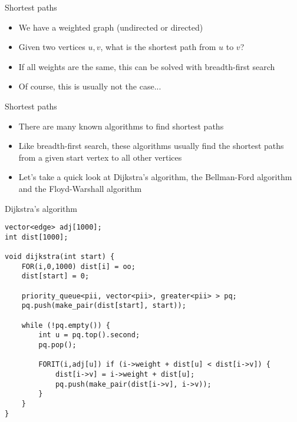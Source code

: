 \documentclass[12pt,t]{beamer}
\newcommand{\bi}{\begin{itemize}}
\newcommand{\ei}{\end{itemize}}
\begin{document}

\begin{frame}{Shortest paths}
    \vspace{40pt}
    \bi
        \item We have a weighted graph (undirected or directed)
        \item Given two vertices $u,v$, what is the shortest path from $u$ to $v$?
        \vspace{10pt}
        \item If all weights are the same, this can be solved with breadth-first search
        \item Of course, this is usually not the case...
    \ei
\end{frame}

\begin{frame}{Shortest paths}
    \vspace{40pt}
    \bi
        \item There are many known algorithms to find shortest paths
        \item Like breadth-first search, these algorithms usually find the shortest paths from a given start vertex to all other vertices
        \vspace{5pt}
        \item Let's take a quick look at Dijkstra's algorithm, the Bellman-Ford algorithm and the Floyd-Warshall algorithm
    \ei
\end{frame}


\begin{frame}[fragile]{Dijkstra's algorithm}
    \begin{verbatim}
vector<edge> adj[1000];
int dist[1000];

void dijkstra(int start) {
    FOR(i,0,1000) dist[i] = oo;
    dist[start] = 0;
    
    priority_queue<pii, vector<pii>, greater<pii> > pq;
    pq.push(make_pair(dist[start], start));

    while (!pq.empty()) {
        int u = pq.top().second;
        pq.pop();

        FORIT(i,adj[u]) if (i->weight + dist[u] < dist[i->v]) {
            dist[i->v] = i->weight + dist[u];
            pq.push(make_pair(dist[i->v], i->v));
        }
    }
}
    \end{verbatim}
\end{frame}
\end{document}
